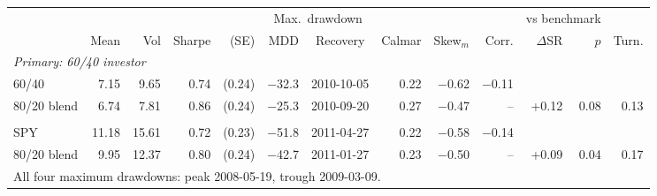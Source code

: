 \begin{tabular}{lrrrrrcrrrrrr}
\toprule
& & & & & \multicolumn{2}{c}{Max.\ drawdown} & & & & \multicolumn{2}{c}{vs benchmark} & \\
\cmidrule(lr){6-7} \cmidrule(lr){11-12}
 & Mean & Vol & Sharpe & (SE) & MDD & Recovery & Calmar & Skew$_m$ & Corr. & $\Delta$SR & $p$ & Turn. \\
\midrule
\multicolumn{13}{l}{\textit{Primary: 60/40 investor}} \\
60/40 & 7.15 & 9.65 & 0.74 & (0.24) & $-$32.3 & 2010-10-05 & 0.22 & $-$0.62 & $-$0.11 &  &  &  \\
80/20 blend & 6.74 & 7.81 & 0.86 & (0.24) & $-$25.3 & 2010-09-20 & 0.27 & $-$0.47 & -- & +0.12 & 0.08 & 0.13 \\
\addlinespace
\multicolumn{13}{l}{\textit{Secondary: equity-only investor}} \\
SPY & 11.18 & 15.61 & 0.72 & (0.23) & $-$51.8 & 2011-04-27 & 0.22 & $-$0.58 & $-$0.14 &  &  &  \\
80/20 blend & 9.95 & 12.37 & 0.80 & (0.24) & $-$42.7 & 2011-01-27 & 0.23 & $-$0.50 & -- & +0.09 & 0.04 & 0.17 \\
\midrule
\multicolumn{13}{l}{All four maximum drawdowns: peak 2008-05-19, trough 2009-03-09.} \\
\bottomrule
\end{tabular}
